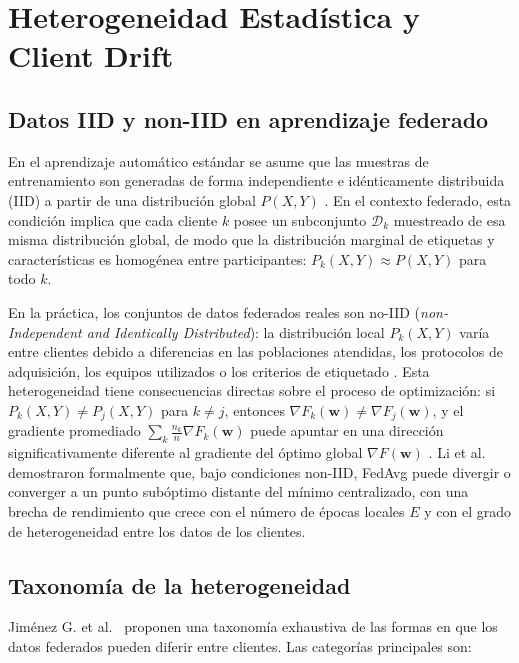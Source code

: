 \section{Heterogeneidad Estadística y Client Drift}
\label{sec:heterogeneidad}

\subsection{Datos IID y non-IID en aprendizaje federado}

En el aprendizaje automático estándar se asume que las muestras de entrenamiento son generadas
de forma independiente e idénticamente distribuida (IID) a partir de una distribución global
$P(X, Y)$ \cite{seo2025understanding}. En el contexto federado, esta condición implica que
cada cliente $k$ posee un subconjunto $\mathcal{D}_k$ muestreado de esa misma distribución
global, de modo que la distribución marginal de etiquetas y características es homogénea entre
participantes: $P_k(X, Y) \approx P(X, Y)$ para todo $k$.

En la práctica, los conjuntos de datos federados reales son no-IID (\textit{non-Independent and
Identically Distributed}): la distribución local $P_k(X, Y)$ varía entre clientes debido a
diferencias en las poblaciones atendidas, los protocolos de adquisición, los equipos utilizados
o los criterios de etiquetado \cite{g2024noniiddatafederatedlearning, seo2025understanding}.
Esta heterogeneidad tiene consecuencias directas sobre el proceso de optimización: si
$P_k(X, Y) \neq P_j(X, Y)$ para $k \neq j$, entonces $\nabla F_k(\mathbf{w}) \neq
\nabla F_j(\mathbf{w})$, y el gradiente promediado $\sum_k \frac{n_k}{n} \nabla F_k(\mathbf{w})$
puede apuntar en una dirección significativamente diferente al gradiente del óptimo global
$\nabla F(\mathbf{w})$ \cite{li2020convergencefedavgnoniiddata}. Li et al.\
\cite{li2020convergencefedavgnoniiddata} demostraron formalmente que, bajo condiciones non-IID,
FedAvg puede divergir o converger a un punto subóptimo distante del mínimo centralizado, con
una brecha de rendimiento que crece con el número de épocas locales $E$ y con el grado de
heterogeneidad entre los datos de los clientes.

\subsection{Taxonomía de la heterogeneidad}
\label{subsec:taxonomia}

Jiménez G. et al.\ \cite{g2024noniiddatafederatedlearning} proponen una taxonomía exhaustiva
de las formas en que los datos federados pueden diferir entre clientes. Las categorías
principales son:

